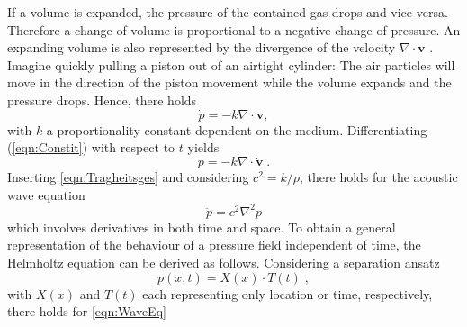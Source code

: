 \documentclass[%
  a4paper,oneside,%
  11pt,%
  smallchapters,
  style=printdev,
  extramargin,
  green,%
  rgb, <cmyk>
  ]{tubsbook}
\begin{document}
If a volume is expanded, the pressure of the contained gas drops and vice versa. Therefore a change of volume is proportional to a negative change of pressure. An expanding volume is also represented by the divergence of the velocity $\nabla \cdot \bm{v}$ \cite[p. 134 ff.]{larson2013}.  Imagine quickly pulling a piston out of an airtight cylinder: The air particles will move in the direction of the piston movement while the volume expands and the pressure drops. Hence, there holds
\begin{equation}
\dot{p} = -k \nabla \cdot \bm{v},
\label{eqn:Constit}
\end{equation}
with $k$ a proportionality constant dependent on the medium.
Differentiating (\ref{eqn:Constit}) with respect to $t$ yields 
\begin{equation}
\ddot{p} = -k \nabla \cdot \dot{\bm{v}} \;.
\end{equation}
Inserting \eqref{eqn:Tragheitsges} and considering $c^2 = k/\rho$, there holds for the acoustic wave equation
\begin{equation}
\ddot{p} = c^2 \nabla^2 p 
\label{eqn:WaveEq}
\end{equation}
which involves derivatives in both time and space. To obtain a general representation of the behaviour of a pressure field independent of time, the Helmholtz equation can be derived as follows.
Considering a separation ansatz \cite[p.659]{westermann2015} 
\begin{equation}
p(x,t) = X(x) \cdot T(t) \; ,
\end{equation}
with $X(x)$ and $T(t)$ each representing only location or time, respectively,
there holds for \eqref{eqn:WaveEq}
\end{document}
